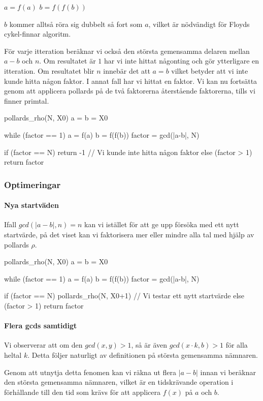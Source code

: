 \documentclass[a4paper,12pt]{article}
\renewcommand{\*}{\ensuremath{\cdot}}
\begin{document}
$a = f(a)$
$b = f(f(b))$

$b$ kommer alltså röra sig dubbelt så fort som $a$, vilket är nödvändigt för Floyds cykel-finnar algoritm.

För varje itteration beräknar vi också den största gemensamma delaren mellan $a-b$ och $n$. Om resultatet är $1$ har vi inte hittat någonting och gör ytterligare en itteration. Om resultatet blir $n$ innebär det att $a=b$ vilket betyder att vi inte kunde hitta någon faktor. I annat fall har vi hittat en faktor. Vi kan nu fortsätta genom att applicera pollards på de två faktorerna återstående faktorerna, tills vi finner primtal.

pollards_rho(N, X0)
    a = b = X0

    while (factor == 1)
        a = f(a)
        b = f(f(b))
        factor = gcd(|a-b|, N)

    if (factor == N)
        return -1 // Vi kunde inte hitta någon faktor
    else (factor > 1)
        return factor


\subsubsection{Optimeringar}
\paragraph{Nya startväden}

Ifall $gcd(|a-b|, n) = n$ kan vi istället för att ge upp försöka med ett nytt startvärde, på det viset kan vi faktorisera mer eller mindre alla tal med hjälp av pollards $\rho$.

pollards_rho(N, X0)
    a = b = X0

    while (factor == 1)
        a = f(a)
        b = f(f(b))
        factor = gcd(|a-b|, N)
    
    if (factor == N)
        pollards_rho(N, X0+1) // Vi testar ett nytt startvärde
    else (factor > 1)
        return factor

\paragraph{Flera gcds samtidigt}

Vi observerar att om den $gcd(x, y) > 1$, så är även $gcd(x\cdot k, b)>1$ för alla heltal $k$. Detta följer naturligt av definitionen på största gemensamma nämnaren.

Genom att utnytja detta fenomen kan vi räkna ut flera $|a-b|$ innan vi beräknar den största gemensamma nämnaren, vilket är en tidskrävande operation i förhållande till den tid som krävs för att applicera $f(x)$ på $a$ och $b$.
\end{document}
